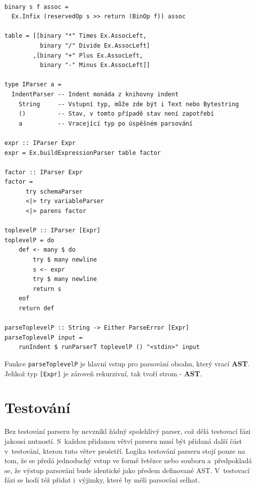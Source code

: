 \documentclass[male, czech]{kithesis}
\newenvironment{code}{\captionsetup{type=listing}}{}
\newcommand{\haskellInline}[1]{\colorbox{gray!10}{\texttt{#1}}}
\begin{document}
\begin{code}
\begin{verbatim}

binary s f assoc = 
  Ex.Infix (reservedOp s >> return (BinOp f)) assoc

table = [[binary "*" Times Ex.AssocLeft,
          binary "/" Divide Ex.AssocLeft]
        ,[binary "+" Plus Ex.AssocLeft,
          binary "-" Minus Ex.AssocLeft]]

type IParser a = 
  IndentParser -- Indent monáda z knihovny indent
    String     -- Vstupní typ, může zde být i Text nebo Bytestring
    ()         -- Stav, v tomto případě stav není zapotřebí
    a          -- Vracející typ po úspěšném parsování

expr :: IParser Expr
expr = Ex.buildExpressionParser table factor

factor :: IParser Expr
factor = 
      try schemaParser 
      <|> try variableParser
      <|> parens factor 

toplevelP :: IParser [Expr]
toplevelP = do 
    def <- many $ do 
        try $ many newline
        s <- expr 
        try $ many newline
        return s
    eof
    return def

parseToplevelP :: String -> Either ParseError [Expr]
parseToplevelP input = 
    runIndent $ runParserT toplevelP () "<stdin>" input

\end{verbatim}
\end{code}

Funkce \haskellInline{parseToplevelP} je hlavní vstup pro parsování obsahu,
který vrací \textbf{AST}. 
Jelikož typ \haskellInline{[Expr]} je zároveň rekurzivní,
tak tvoří strom - \textbf{AST}.

\section{Testování}

Bez testování parseru by nevznikl žádný spolehlivý parser, 
což dělá testovací fázi jakousi nutností.
S~každou přidanou větví parseru musí být přidaná další část v~testování,
kterou tuto větev prošetří. 
Logika testování parseru stojí pouze na tom,
že se předá jednoduchý vstup ve formě řetězce nebo souboru
a~předpokladá se, 
že výstup parsování bude identické jako předem definované AST.
V~testovací fázi se hodí též přidat i~výjimky,
které by měli parsování selhat.
\end{document}
